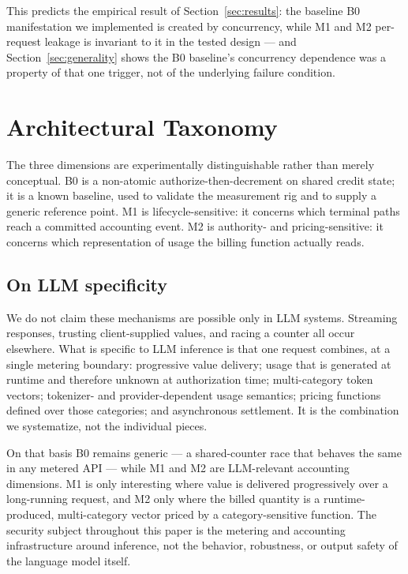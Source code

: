 \documentclass[preprint,3p,authoryear,12pt]{elsarticle}
\begin{document}
This predicts the empirical result of Section~\ref{sec:results}: the baseline B0
manifestation we implemented is created by concurrency, while M1 and M2 per-request
leakage is invariant to it in the tested design --- and Section~\ref{sec:generality}
shows the B0 baseline's concurrency dependence was a property of that one trigger, not
of the underlying failure condition.

\section{Architectural Taxonomy}
\label{sec:taxonomy}
The three dimensions are experimentally distinguishable rather than merely conceptual. B0
is a non-atomic authorize-then-decrement on shared credit state; it is a known baseline,
used to validate the measurement rig and to supply a generic reference point. M1 is
lifecycle-sensitive: it concerns which terminal paths reach a committed accounting event.
M2 is authority- and pricing-sensitive: it concerns which representation of usage the
billing function actually reads.

\subsection{On LLM specificity}
We do not claim these mechanisms are possible only in LLM systems. Streaming responses,
trusting client-supplied values, and racing a counter all occur elsewhere. What is
specific to LLM inference is that one request combines, at a single metering boundary:
progressive value delivery; usage that is generated at runtime and therefore unknown at
authorization time; multi-category token vectors; tokenizer- and provider-dependent usage
semantics; pricing functions defined over those categories; and asynchronous settlement.
It is the combination we systematize, not the individual pieces.

On that basis B0 remains generic --- a shared-counter race that behaves the same in any
metered API --- while M1 and M2 are LLM-relevant accounting dimensions. M1 is only
interesting where value is delivered progressively over a long-running request, and M2
only where the billed quantity is a runtime-produced, multi-category vector priced by a
category-sensitive function. The security subject throughout this paper is the metering
and accounting infrastructure around inference, not the behavior, robustness, or output
safety of the language model itself.
\end{document}

